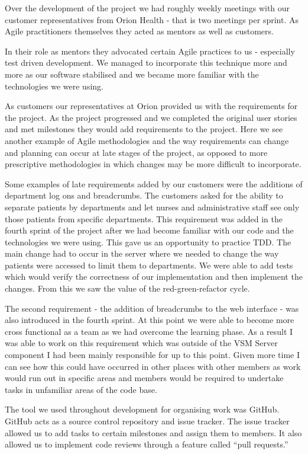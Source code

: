 \documentclass[conference]{IEEEtran}
\begin{document}
Over the development of the project we had roughly weekly meetings with our
customer representatives from Orion Health - that is two meetings per sprint. As
Agile practitioners themselves they acted as mentors as well as customers.

In their role as mentors they advocated certain Agile practices to us -
especially test driven development. We managed to incorporate this technique
more and more as our software stabilised and we became more familiar with the
technologies we were using.

As customers our representatives at Orion provided us with the requirements for
the project. As the project progressed and we completed the original user
stories and met milestones they would add requirements to the project. Here we
see another example of Agile methodologies and the way requirements can change
and planning can occur at late stages of the project, as opposed to more
prescriptive methodologies in which changes may be more difficult to
incorporate.

Some examples of late requirements added by our customers were the additions of
department log ons and breadcrumbs. The customers asked for the ability to
separate patients by departments and let nurses and administrative staff see
only those patients from specific departments. This requirement was added in the
fourth sprint of the project after we had become familiar with our code and the
technologies we were using. This gave us an opportunity to practice TDD. The
main change had to occur in the server where we needed to change the way
patients were accessed to limit them to departments. We were able to add tests
which would verify the correctness of our implementation and then implement the
changes. From this we saw the value of the red-green-refactor cycle.

The second requirement - the addition of breadcrumbs to the web interface - was
also introduced in the fourth sprint. At this point we were able to become more
cross functional as a team as we had overcome the learning phase. As a result I
was able to work on this requirement which was outside of the VSM Server
component I had been mainly responsible for up to this point. Given more time I
can see how this could have occurred in other places with other members as work
would run out in specific areas and members would be required to undertake tasks
in unfamiliar areas of the code base.

The tool we used throughout development for organising work was GitHub. GitHub
acts as a source control repository and issue tracker. The issue tracker allowed
us to add tasks to certain milestones and assign them to members. It also
allowed us to implement code reviews through a feature called ``pull requests.''
\end{document}
